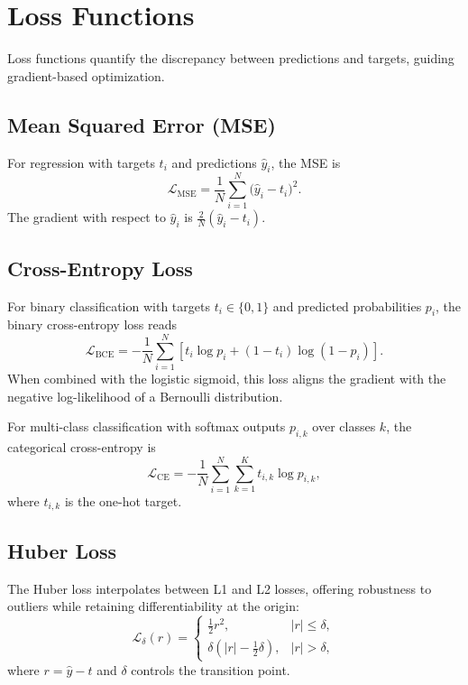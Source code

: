 ﻿\documentclass{article}
\begin{document}
\section{Loss Functions}
Loss functions quantify the discrepancy between predictions and targets, guiding gradient-based optimization.

\subsection{Mean Squared Error (MSE)}
For regression with targets $t_i$ and predictions $\hat{y}_i$, the MSE is
\begin{equation}
  \mathcal{L}_{\mathrm{MSE}} = \frac{1}{N} \sum_{i=1}^{N} \bigl(\hat{y}_i - t_i\bigr)^2.
\end{equation}
The gradient with respect to $\hat{y}_i$ is $\frac{2}{N}(\hat{y}_i - t_i)$.

\subsection{Cross-Entropy Loss}
For binary classification with targets $t_i \in \{0,1\}$ and predicted probabilities $p_i$, the binary cross-entropy loss reads
\begin{equation}
  \mathcal{L}_{\mathrm{BCE}} = -\frac{1}{N} \sum_{i=1}^{N} \left[t_i \log p_i + (1-t_i) \log(1-p_i)\right].
\end{equation}
When combined with the logistic sigmoid, this loss aligns the gradient with the negative log-likelihood of a Bernoulli distribution.

For multi-class classification with softmax outputs $p_{i,k}$ over classes $k$, the categorical cross-entropy is
\begin{equation}
  \mathcal{L}_{\mathrm{CE}} = -\frac{1}{N} \sum_{i=1}^{N} \sum_{k=1}^{K} t_{i,k} \log p_{i,k},
\end{equation}
where $t_{i,k}$ is the one-hot target.

\subsection{Huber Loss}
The Huber loss interpolates between L1 and L2 losses, offering robustness to outliers while retaining differentiability at the origin:
\begin{equation}
  \mathcal{L}_{\delta}(r) = \begin{cases}
    \tfrac{1}{2} r^2, & |r| \le \delta, \\
    \delta(|r| - \tfrac{1}{2}\delta), & |r| > \delta,
  \end{cases}
\end{equation}
where $r = \hat{y} - t$ and $\delta$ controls the transition point.
\end{document}
